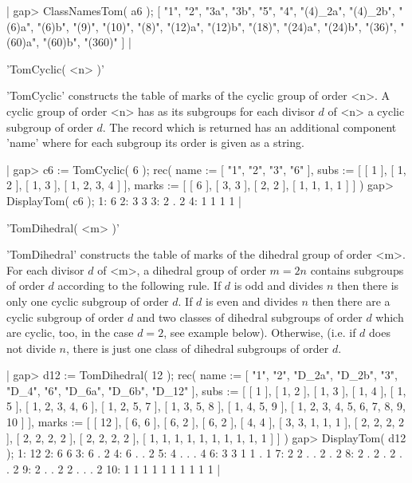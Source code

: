 |    gap> ClassNamesTom( a6 );
    [ "1", "2", "3a", "3b", "5", "4", "(4)_2a", "(4)_2b", "(6)a", "(6)b",
      "(9)", "(10)", "(8)", "(12)a", "(12)b", "(18)", "(24)a", "(24)b", 
      "(36)", "(60)a", "(60)b", "(360)" ] |


'TomCyclic( <n> )'

'TomCyclic' constructs the table  of marks  of the cyclic group  of order
<n>.  A cyclic  group of order <n>  has as its subgroups for each divisor
$d$ of <n> a cyclic subgroup  of order $d$.  The record which is returned
has an additional  component 'name'  where for each subgroup its order is
given as a string.

|    gap> c6 := TomCyclic( 6 );
    rec(
      name := [ "1", "2", "3", "6" ],
      subs := [ [ 1 ], [ 1, 2 ], [ 1, 3 ], [ 1, 2, 3, 4 ] ],
      marks := [ [ 6 ], [ 3, 3 ], [ 2, 2 ], [ 1, 1, 1, 1 ] ] )
    gap> DisplayTom( c6 );
    1:  6
    2:  3 3
    3:  2 . 2
    4:  1 1 1 1 |


'TomDihedral( <m> )'

'TomDihedral' constructs  the table  of  marks  of  the dihedral group of
order  <m>.  For  each divisor $d$ of <m>, a dihedral group of order $m =
2n$ contains  subgroups of order $d$ according to the following rule.  If
$d$ is odd  and divides $n$ then there is  only  one cyclic  subgroup  of
order  $d$.  If  $d$ is even and  divides  $n$ then  there  are  a cyclic
subgroup of order $d$ and two classes of dihedral subgroups of  order $d$
which  are  cyclic,  too,  in the  case  $d  =  2$, see  example  below).
Otherwise, (i.e. if  $d$  does not divide $n$, there is just one class of
dihedral subgroups of order $d$.

|    gap> d12 := TomDihedral( 12 );
    rec(
      name := [ "1", "2", "D_{2}a", "D_{2}b", "3", "D_{4}", "6", 
          "D_{6}a", "D_{6}b", "D_{12}" ],
      subs := [ [ 1 ], [ 1, 2 ], [ 1, 3 ], [ 1, 4 ], [ 1, 5 ], 
          [ 1, 2, 3, 4, 6 ], [ 1, 2, 5, 7 ], [ 1, 3, 5, 8 ], 
          [ 1, 4, 5, 9 ], [ 1, 2, 3, 4, 5, 6, 7, 8, 9, 10 ] ],
      marks := [ [ 12 ], [ 6, 6 ], [ 6, 2 ], [ 6, 2 ], [ 4, 4 ], 
          [ 3, 3, 1, 1, 1 ], [ 2, 2, 2, 2 ], [ 2, 2, 2, 2 ], 
          [ 2, 2, 2, 2 ], [ 1, 1, 1, 1, 1, 1, 1, 1, 1, 1 ] ] )
    gap> DisplayTom( d12 );
     1:  12
     2:   6 6
     3:   6 . 2
     4:   6 . . 2
     5:   4 . . . 4
     6:   3 3 1 1 . 1
     7:   2 2 . . 2 . 2
     8:   2 . 2 . 2 . . 2
     9:   2 . . 2 2 . . . 2
    10:   1 1 1 1 1 1 1 1 1 1 |

